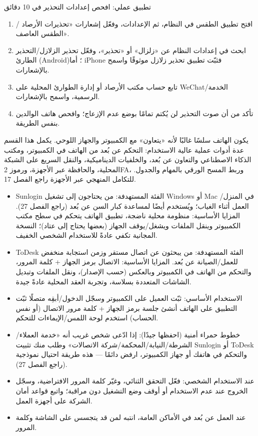 \begin{tcbpractice}{تطبيق عملي: افحص إعدادات التحذير في 10 دقائق}
\begin{enumerate}
  \item افتح تطبيق الطقس في النظام، ثم الإعدادات، وفعّل إشعارات «تحذيرات الأرصاد / الطقس العاصف».
  \item ابحث في إعدادات النظام عن «زلزال» أو «تحذير»، وفعّل تحذير الزلازل/التحذير الطارئ (Android)؛ أما iPhone فثبّت تطبيق تحذير زلازل موثوقًا واسمح بالإشعارات.
  \item تابع حساب مكتب الأرصاد أو إدارة الطوارئ المحلية على WeChat/الخدمة الرسمية، واسمح بالإشعارات.
  \item تأكد من أن صوت التحذير لن يُكتم تمامًا بوضع عدم الإزعاج؛ وافحص هاتف الوالدين بنفس الطريقة.
\end{enumerate}

\end{tcbpractice}


يكون الهاتف سلسًا غالبًا لأنه «يتعاون» مع الكمبيوتر والجهاز اللوحي. يكمل هذا القسم عدة أدوات عملية عالية الاستخدام: التحكم عن بُعد من الهاتف في الكمبيوتر، ومكتب الذكاء الاصطناعي والتعاون عن بُعد، والخلفيات الديناميكية، والنقل السريع على الشبكة المحلية، والحافظة عبر الأجهزة، ورموز 2FA، وربط المسح الورقي بالمهام والجدول. للتكامل المنهجي عبر الأجهزة راجع الفصل 17.


\begin{itemize}
  \item Sunlogin الفئة المستهدفة: من يحتاجون إلى تشغيل Windows أو Mac في المنزل/العمل أثناء الغياب؛ ويُستخدم أيضًا لمساعدة كبار السن عن بُعد (راجع الفصل 27). المزايا الأساسية: منظومة محلية ناضجة، تطبيق الهاتف يتحكم في سطح مكتب الكمبيوتر وينقل الملفات ويشغل/يوقف الجهاز (بعضها يحتاج إلى عتاد)؛ النسخة المجانية تكفي عادةً للاستخدام الشخصي الخفيف.
  \item ToDesk الفئة المستهدفة: من يبحثون عن اتصال مستقر وزمن استجابة منخفض للعمل/الصيانة عن بُعد. المزايا الأساسية: الاتصال برمز الجهاز + كلمة المرور، والتحكم من الهاتف في الكمبيوتر وبالعكس (حسب الإصدار)، ونقل الملفات وتبديل الشاشات المتعددة بسلاسة، وتجربة العقد المحلية عادةً جيدة.
  \item الاستخدام الأساسي: ثبّت العميل على الكمبيوتر وسجّل الدخول/أبقِه متصلًا ثبّت التطبيق على الهاتف أنشئ جلسة برمز الجهاز + كلمة مرور الاتصال (أو نفس الحساب) استخدم لوحة اللمس/الإيماءات للتحكم.
  \item خطوط حمراء أمنية (احفظها جيدًا): إذا ادّعى شخص غريب أنه «خدمة العملاء/الشرطة/النيابة/المحكمة/شركة الاتصالات» وطلب منك تثبيت Sunlogin أو ToDesk والتحكم في هاتفك أو جهاز الكمبيوتر، ارفض دائمًا — هذه طريقة احتيال نموذجية (راجع الفصل 27).
  \item عند الاستخدام الشخصي: فعّل التحقق الثنائي، وغيّر كلمة المرور الافتراضية، وسجّل الخروج عند عدم الاستخدام أو أوقف وضع التشغيل دون مراقبة؛ واتبع قواعد أمان الشركة على أجهزة العمل.
  \item عند العمل عن بُعد في الأماكن العامة، انتبه لمن قد يتجسس على الشاشة وكلمة المرور.
\end{itemize}

